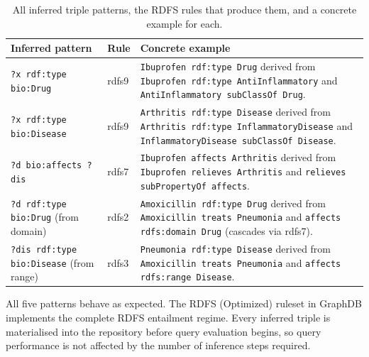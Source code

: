 \documentclass[11pt,a4paper]{article}
\begin{document}
\begin{table}[h!]
\centering
\caption{All inferred triple patterns, the RDFS rules that produce them, and a
         concrete example for each.}
\renewcommand{\arraystretch}{1.35}
\begin{tabular}{@{}p{4.6cm}p{1.8cm}p{7cm}@{}}
\toprule
\textbf{Inferred pattern} & \textbf{Rule} & \textbf{Concrete example} \\
\midrule
\texttt{?x rdf:type bio:Drug} &
rdfs9 &
\texttt{Ibuprofen rdf:type Drug} derived from
\texttt{Ibuprofen rdf:type AntiInflammatory} and
\texttt{AntiInflammatory subClassOf Drug}. \\

\texttt{?x rdf:type bio:Disease} &
rdfs9 &
\texttt{Arthritis rdf:type Disease} derived from
\texttt{Arthritis rdf:type InflammatoryDisease} and
\texttt{InflammatoryDisease subClassOf Disease}. \\

\texttt{?d bio:affects ?dis} &
rdfs7 &
\texttt{Ibuprofen affects Arthritis} derived from
\texttt{Ibuprofen relieves Arthritis} and
\texttt{relieves subPropertyOf affects}. \\

\texttt{?d rdf:type bio:Drug} (from domain) &
rdfs2 &
\texttt{Amoxicillin rdf:type Drug} derived from
\texttt{Amoxicillin treats Pneumonia} and
\texttt{affects rdfs:domain Drug} (cascades via rdfs7). \\

\texttt{?dis rdf:type bio:Disease} (from range) &
rdfs3 &
\texttt{Pneumonia rdf:type Disease} derived from
\texttt{Amoxicillin treats Pneumonia} and
\texttt{affects rdfs:range Disease}. \\
\bottomrule
\end{tabular}
\end{table}

\noindent All five patterns behave as expected.  The RDFS (Optimized) ruleset
in GraphDB implements the complete RDFS entailment regime.  Every inferred triple
is materialised into the repository before query evaluation begins, so query
performance is not affected by the number of inference steps required.
\end{document}
